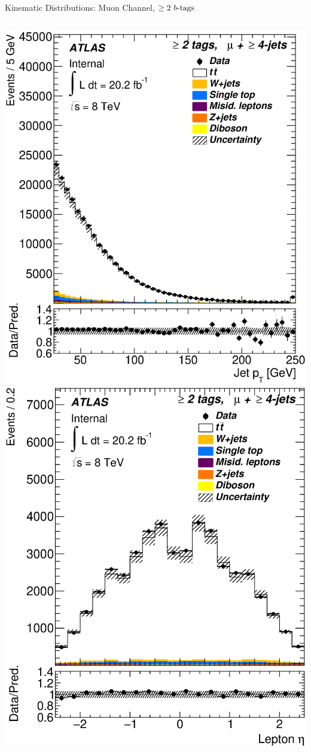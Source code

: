 \documentclass{beamer}
\begin{document}
{\begin{frame}{Kinematic Distributions: Muon Channel, $\geq2\text{ } \lowercase{ b\text{-tags}}$}
\begin{columns}
      \includegraphics[width=.95\textwidth]{../chapters/whel/figures/control_Plots2/bTag_2incl/JetPt_mu}
      \includegraphics[width=.95\textwidth]{../chapters/whel/figures/control_Plots2/bTag_2incl/LeptonEta_mu}\\

\end{columns}
\end{frame}}
\end{document}
